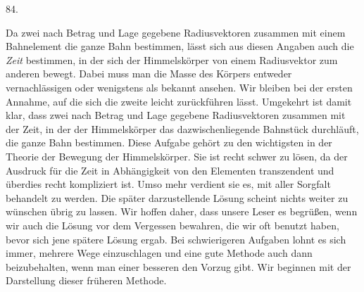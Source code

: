 \par{}\medskip
\hypertarget{native-113-article084}{}
\begin{center}84.\end{center}
Da zwei nach Betrag und Lage gegebene Radiusvektoren zusammen mit einem Bahnelement die ganze Bahn bestimmen, lässt sich aus diesen Angaben auch die \emph{Zeit} bestimmen, in der sich der Himmelskörper von einem Radiusvektor zum anderen bewegt. Dabei muss man die Masse des Körpers entweder vernachlässigen oder wenigstens als bekannt ansehen. Wir bleiben bei der ersten Annahme, auf die sich die zweite leicht zurückführen lässt. Umgekehrt ist damit klar, dass zwei nach Betrag und Lage gegebene Radiusvektoren zusammen mit der Zeit, in der der Himmelskörper das dazwischenliegende Bahnstück durchläuft, die ganze Bahn bestimmen. Diese Aufgabe gehört zu den wichtigsten in der Theorie der Bewegung der Himmelskörper. Sie ist recht schwer zu lösen, da der Ausdruck für die Zeit in Abhängigkeit von den Elementen transzendent und überdies recht kompliziert ist. Umso mehr verdient sie es, mit aller Sorgfalt behandelt zu werden. Die später darzustellende Lösung scheint nichts weiter zu wünschen übrig zu lassen. Wir hoffen daher, dass unsere Leser es begrüßen, wenn wir auch die Lösung vor dem Vergessen bewahren, die wir oft benutzt haben, bevor sich jene spätere Lösung ergab. Bei schwierigeren Aufgaben lohnt es sich immer, mehrere Wege einzuschlagen und eine gute Methode auch dann beizubehalten, wenn man einer besseren den Vorzug gibt. Wir beginnen mit der Darstellung dieser früheren Methode.
